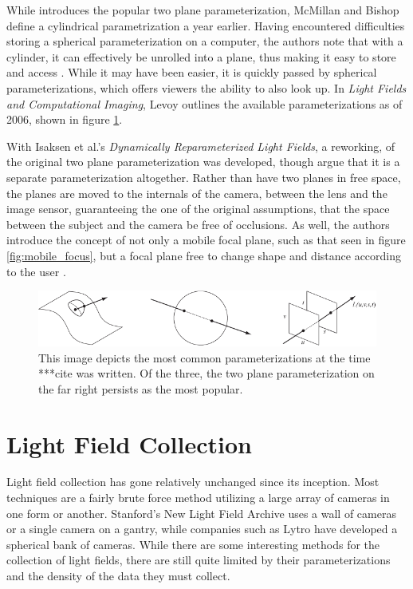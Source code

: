 \documentclass[12pt]{report}
\begin{document}
While \cite{Levoy96} introduces the popular two plane parameterization, McMillan and Bishop define a cylindrical parametrization a year earlier. Having encountered difficulties storing a spherical parameterization on a computer, the authors note that with a cylinder, it can effectively be unrolled into a plane, thus making it easy to store and access \cite{McMillan95}. While it may have been easier, it is quickly passed by spherical parameterizations, which offers viewers the ability to also look up. In \emph{Light Fields and Computational Imaging}, Levoy outlines the available parameterizations as of 2006, shown in figure \ref{fig:parameterization_visual}.

With Isaksen et al.'s \emph{Dynamically Reparameterized Light Fields}, a reworking, of the original two plane parameterization was developed, though \cite{Camahort09} argue that it is a separate parameterization altogether. Rather than have two planes in free space, the planes are moved to the internals of the camera, between the lens and the image sensor, guaranteeing the one of the original assumptions, that the space between the subject and the camera be free of occlusions. As well, the authors introduce the concept of not only a mobile focal plane, such as that seen in figure \ref{fig:mobile_focus}, but a focal plane free to change shape and distance according to the user \cite{Isaksen01}. 

\begin{figure}[!ht]
	\centering
	\includegraphics[scale=0.75]{Light-field-parameterizations.png}
	\caption{This image depicts the most common parameterizations at the time ***cite was written. Of the three, the two plane parameterization on the far right persists as the most popular.}
	\label{fig:parameterization_visual}
\end{figure}

\section{Light Field Collection}
Light field collection has gone relatively unchanged since its inception. Most techniques are a fairly brute force method utilizing a large array of cameras in one form or another. Stanford's New Light Field Archive uses a wall of cameras or a single camera on a gantry, while companies such as Lytro have developed a spherical bank of cameras. While there are some interesting methods for the collection of light fields, there are still quite limited by their parameterizations and the density of the data they must collect. 
\end{document}
